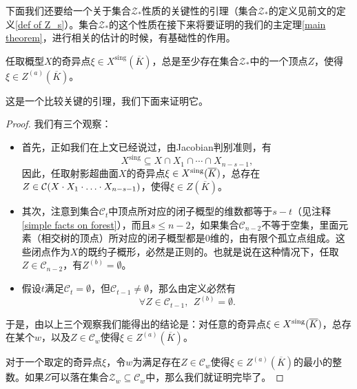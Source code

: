 下面我们还要给一个关于集合$\mathcal Z_*$性质的关键性的引理（集合$\mathcal Z_*$的定义见前文的定义\ref{def of Z_s}）。集合$\mathcal Z_*$的这个性质在接下来将要证明的我们的主定理\ref{main theorem}，进行相关的估计的时候，有基础性的作用。

\begin{lemma} \label{control of singular locus}
任取概型$X$的奇异点$\xi\in X^{\mathrm{sing}}(\overline{K})$，总是至少存在集合$\mathcal Z_*$中的一个顶点$Z$，使得$\xi\in Z^{(a)}(\overline K)$。
\end{lemma}
这是一个比较关键的引理，我们下面来证明它。
\begin{proof}
我们有三个观察：
\begin{itemize}
\item 首先，正如我们在上文已经说过，由Jacobian判别准则，有
\begin{equation}
X^\mathrm{sing}\subseteq X\cap X_1\cap\cdots\cap X_{n-s-1},
\end{equation}
因此，任取射影超曲面$X$的奇异点$\xi\in X^{\operatorname{\mathrm{sing}}}(\overline{K})$，总存在$Z\in\mathcal C(X\cdot X_{1}\cdot\ldots\cdot X_{n-s-1})$，使得$\xi \in Z(\overline{K})$。
\item 其次，注意到集合$\mathcal{C}_t$中顶点所对应的闭子概型的维数都等于$s-t$（见注释\ref{simple facts on forest}），而且$s\leqslant n-2$，如果集合$\mathcal{C}_{n-2}$不等于空集，里面元素（相交树的顶点）所对应的闭子概型都是$0$维的，由有限个孤立点组成。这些闭点作为$X$的既约子概形，必然是正则的。也就是说在这种情况下，任取$Z \in \mathcal{C}_{n-2}$，有$Z^{(b)} = \emptyset$。
\item 假设$t$满足$\mathcal{C}_t = \emptyset$，但$\mathcal{C}_{t-1} \neq \emptyset$，那么由定义必然有
\begin{equation}
\forall Z \in \mathcal{C}_{t-1}, ~~ Z^{(b)} = \emptyset.
\end{equation}
\end{itemize}
于是，由以上三个观察我们能得出的结论是：对任意的奇异点$\xi\in X^{\operatorname{\mathrm{sing}}}(\overline{K})$，总存在某个$w$，以及$Z\in \mathcal{C}_w$使得$\xi\in Z^{(a)}(\overline{K})$。

对于一个取定的奇异点$\xi$，令$w$为满足存在$Z\in \mathcal{C}_w$使得$\xi\in Z^{(a)}(\overline{K})$的最小的整数。如果$Z$可以落在集合$\mathcal{Z}_w \subseteq \mathcal{C}_w$中，那么我们就证明完毕了。


\end{proof}
